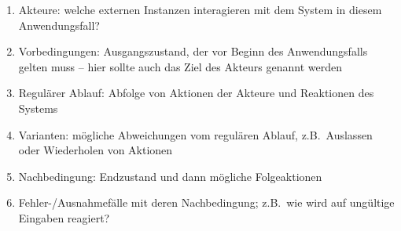 \documentclass[fontsize=12pt,paper=a4,twoside]{scrartcl}
\begin{document}
{\begin{enumerate}
    \item Akteure: welche externen Instanzen interagieren mit
    dem System in diesem Anwendungsfall?  
    
    \item Vorbedingungen: Ausgangszustand, der vor Beginn des
    Anwendungsfalls gelten muss -- hier sollte auch das Ziel des Akteurs
    genannt werden
    
    \item Regulärer Ablauf: Abfolge von Aktionen der Akteure und
    Reaktionen des Systems
    
    \item Varianten: mögliche Abweichungen vom regulären Ablauf, z.B.\ 
    Auslassen oder Wiederholen von Aktionen
    
    \item Nachbedingung: Endzustand und dann mögliche Folgeaktionen 
  
    \item Fehler-/Ausnahmefälle mit deren Nachbedingung; z.B.\ wie wird
    auf ungültige Eingaben reagiert?
  \end{enumerate}
  }
\end{document}
